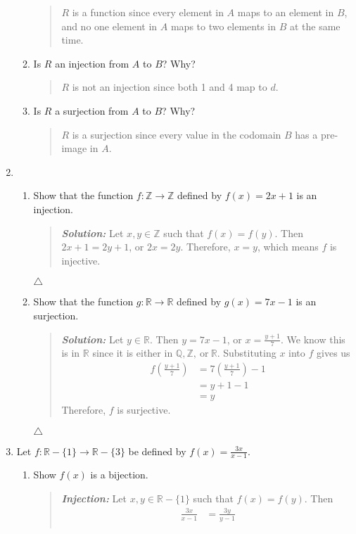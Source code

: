 \documentclass{article}
\newcommand{\SLN}{\indent\textit{\textbf{Solution: }}}
\newcommand{\ZZ}{\mathbb{Z}}
\newcommand{\RR}{\mathbb{R}}
\newcommand{\QQ}{\mathbb{Q}}
\begin{document}
\begin{enumerate}
\begin{enumerate}
\begin{quote}
$R$ is a function since every element in $A$ maps to an element in $B$, and no one element
in $A$ maps to two elements in $B$ at the same time.
\end{quote}
\item Is $R$ an injection from $A$ to $B$? Why?
\begin{quote}
$R$ is not an injection since both 1 and 4 map to $d$.
\end{quote}
\item Is $R$ a surjection from $A$ to $B$? Why?
\begin{quote}
$R$ is a surjection since every value in the codomain $B$ has a pre-image in $A$.
\end{quote}
\end{enumerate}
\newpage
\item
\begin{enumerate}
\item Show that the function $f:\ZZ \to \ZZ$ defined by $f(x)=2x+1$ is an injection.
\begin{quote}
\SLN Let $x,y \in \ZZ$ such that $f(x) = f(y)$.
Then $2x + 1 = 2y + 1$, or $2x = 2y$.
Therefore, $x = y$, which means $f$ is injective.
\end{quote}
$\triangle$
\item Show that the function $g:\RR \to \RR$ defined by $g(x) = 7x - 1$ is an surjection.
\begin{quote}
\SLN Let $y \in \RR$. Then $y = 7x - 1$, or $x = \frac{y + 1}{7}$.
We know this is in $\RR$ since it is either in $\QQ, \ZZ,\ \text{or}\  \RR$.
Substituting $x$ into $f$ gives us
\begin{align*}
f\left(\frac{y + 1}{7}\right) &= 7\left(\frac{y + 1}{7}\right) - 1\\
&= y + 1 - 1\\
&= y
\end{align*}
Therefore, $f$ is surjective.
\end{quote}
$\triangle$
\end{enumerate}
\item Let $f: \RR - \{1\} \to \RR - \{3\}$ be defined by $f(x) = \frac{3x}{x - 1}$.
\begin{enumerate}
\item Show $f(x)$ is a bijection.
\begin{quote}
\textit{\textbf{Injection: }} Let $x,y \in \RR - \{1\}$ such that $f(x) = f(y)$.
Then
\begin{align*}
\frac{3x}{x - 1} &= \frac{3y}{y - 1}\\

\end{align*}
\end{quote}
\end{enumerate}
\end{enumerate}
\end{document}
